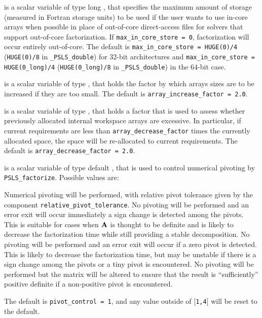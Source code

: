 \documentclass{galahad}
\newcommand{\packagename}{PSLS}
\newcommand{\fullpackagename}{\libraryname\_\-\packagename}
\begin{document}
\begin{description}
 is a scalar variable of type long \integer,
that specifies the maximum amount of storage (measured in Fortran storage units)
to be used if the user wants to use in-core arrays when possible in place of
out-of-core direct-access files for solvers that support out-of-core
factorization. If {\tt max\_in\_core\_store = 0}, factorization will
occur entirely out-of-core.
The default is {\tt max\_in\_core\_store = HUGE(0)/4}
({\tt HUGE(0)/8} in {\tt \fullpackagename\-\_\-double})
for 32-bit architectures and
{\tt max\_in\_core\_store = HUGE(0\_long)/4}
({\tt HUGE(0\_long)/8}
in {\tt \fullpackagename\-\_\-double})
in the 64-bit case.

 is a scalar variable of type \realdp, that holds
the factor by which arrays sizes are to be increased if they are too small.
The default is {\tt array\_increase\_factor = 2.0}.

 is a scalar variable of type \realdp, that holds
a factor that is used to assess whether previously allocated internal
workspace arrays are excessive. In particular, if current requirements are
less than {\tt array\_decrease\_factor} times the currently allocated space,
the space will be re-allocated to current requirements.
The default is {\tt array\_decrease\_factor = 2.0}.

 is a scalar variable of type default \integer,
that is used to control numerical pivoting by {\tt \packagename\_\-factorize}.
Possible values are:
\begin{description}
   Numerical pivoting will be performed, with relative pivot
     tolerance given by the component {\tt relative\_\-pivot\_tolerance}.
   No pivoting will be performed and an error exit will occur
     immediately a sign change is detected among the pivots. This is
     suitable for cases when ${\mathbf{A}}$  is thought to be definite and is likely to
     decrease the factorization time while still providing a stable
     decomposition.
   No pivoting will be performed and an error exit will occur if a
     zero pivot is detected. This is likely to decrease the factorization
     time, but may be unstable if there is a sign change among the pivots
     or a tiny pivot is encountered.
   No pivoting will be performed but the matrix will be altered
     to ensure that the result is ``sufficiently'' positive definite
     if a non-positive pivot is encountered.
\end{description}
The default is {\tt pivot\_control = 1}, and any value outside of
$[${\tt1,4}$]$ will be reset to the default.


\end{description}
\end{document}
